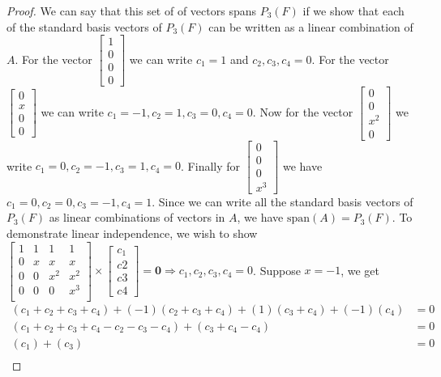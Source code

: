 \documentclass{article}
\begin{document}
\begin{proof}
	We can say that this set of of vectors spans $P_3(F)$ if we show that each of the standard basis vectors of $P_3(F)$ can be written as a linear combination of $A$. For the vector
	$\begin{bmatrix} 1 \\ 0 \\ 0 \\ 0 \end{bmatrix}$ we can write $c_1 = 1$ and $c_2, c_3, c_4 = 0$. For the vector $\begin{bmatrix} 0 \\ x \\ 0 \\ 0\end{bmatrix}$ we can write $c_1 = -1, c_2 = 1, c_3 = 0, c_4 = 0$. Now for the vector $\begin{bmatrix} 0 \\ 0 \\ x^2 \\ 0\end{bmatrix}$ we write $c_1 = 0, c_2 = -1, c_3 = 1, c_4 = 0$. Finally for  $\begin{bmatrix} 0 \\ 0 \\ 0 \\ x^3\end{bmatrix}$ we have $c_1 = 0, c_2 = 0, c_3 = -1, c_4 = 1$. Since we can write all the standard basis vectors of $P_3(F)$ as linear combinations of vectors in $A$, we have $\text{span}( A )= P_3(F)$. To demonstrate linear independence, we wish to show
	$
	\begin{bmatrix}
	1 & 1 & 1 & 1 \\
	0 & x & x & x \\
	0 & 0 & x^2 & x^2 \\
	0 & 0 & 0 & x^3 \\
	\end{bmatrix} \times
	\begin{bmatrix}
	c_1 \\ c2 \\ c3 \\ c4
	\end{bmatrix} = \mathbf{0} \Rightarrow c_1, c_2, c_3, c_4 = 0$.
	Suppose $x = -1$, we get 
	\begin{align*}
	(c_1 + c_2 + c_3 + c_4) + (-1)(c_2 + c_3 + c_4) + (1)(c_3 + c_4) + (-1)(c_4) & = 0 \\
	(c_1 + c_2 + c_3 + c_4 - c_2 - c_3 - c_4) + (c_3 + c_4 - c_4) & = 0 \\
	(c_1) + (c_3) & = 0\\

\end{align*}
\end{proof}
\end{document}
